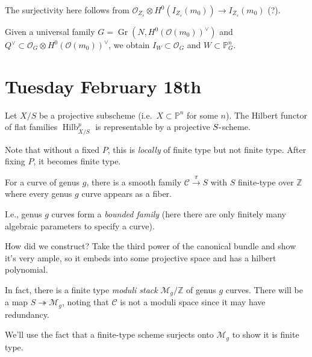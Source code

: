 The surjectivity here follows from
\({\mathcal{O}}_{Z_s} \otimes H^0(I_{Z_s}(m_0)) \to I_{Z_s}(m_0)\) (?).

Given a universal family
\(G = {\operatorname{Gr}}( N, H^0({\mathcal{O}}(m_0))^\vee)\) and
\(Q^\vee\subset {\mathcal{O}}_G \otimes H^0({\mathcal{O}}(m_0))^\vee\),
we obtain \(I_W \subset {\mathcal{O}}_G\) and
\(W \subset {\mathbb{P}}^n_G\).

\hypertarget{tuesday-february-18th}{%
\section{Tuesday February 18th}\label{tuesday-february-18th}}

\begin{description}
\tightlist
\item[Theorem]
Let \(X/S\) be a projective subscheme (i.e.~\(X\subset {\mathbb{P}}^n\)
for some \(n\)). The Hilbert functor of flat families
\(\operatorname{Hilb}_{X/S}^p\) is representable by a projective
\(S{\hbox{-}}\)scheme.
\end{description}

Note that without a fixed \(P\), this is \emph{locally} of finite type
but not finite type. After fixing \(P\), it becomes finite type.

\begin{description}
\tightlist
\item[Example]
For a curve of genus \(g\), there is a smooth family
\({\mathcal{C}}\xrightarrow{\pi} S\) with \(S\) finite-type over
\({\mathbb{Z}}\) where every genus \(g\) curve appears as a fiber.
\end{description}

I.e., genus \(g\) curves form a \emph{bounded family} (here there are
only finitely many algebraic parameters to specify a curve).

How did we construct? Take the third power of the canonical bundle and
show it's very ample, so it embeds into some projective space and has a
hilbert polynomial.

In fact, there is a finite type \emph{moduli stack}
\({\mathcal{M}}_g / {\mathbb{Z}}\) of genus \(g\) curves. There will be
a map \(S \twoheadrightarrow{\mathcal{M}}_g\), noting that
\({\mathcal{C}}\) is not a moduli space since it may have redundancy.

We'll use the fact that a finite-type scheme surjects onto
\({\mathcal{M}}_g\) to show it is finite type.

